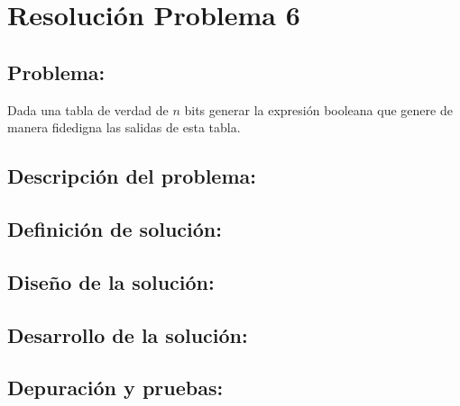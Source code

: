 \section{Resolución Problema 6}
\subsection{Problema:}
\item Dada una tabla de verdad de $n$ bits generar la expresión booleana que genere de manera fidedigna las salidas de esta tabla.

\subsection{\textbf{Descripción del problema:}}

\subsection{\textbf{Definición de solución:}}

\subsection{\textbf{Diseño de la solución:}}

\subsection{\textbf{Desarrollo de la solución:}}

\subsection{\textbf{Depuración y pruebas:}}